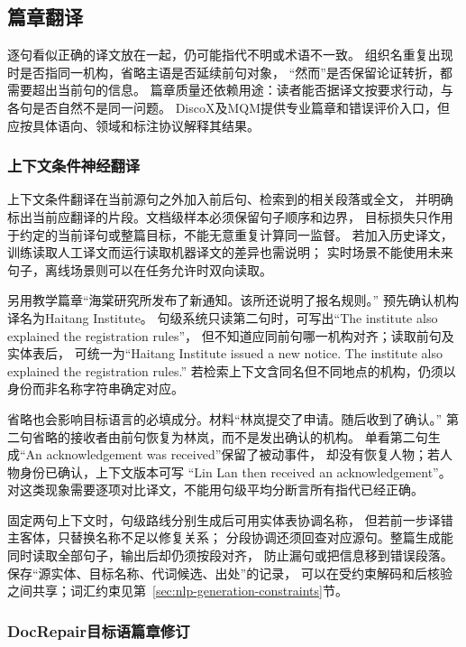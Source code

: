 \subsection{篇章翻译}
\label{sec:nlp-generation-document-translation}

逐句看似正确的译文放在一起，仍可能指代不明或术语不一致。
组织名重复出现时是否指同一机构，省略主语是否延续前句对象，
“然而”是否保留论证转折，都需要超出当前句的信息。
篇章质量还依赖用途：读者能否据译文按要求行动，与各句是否自然不是同一问题。
DiscoX及MQM提供专业篇章和错误评价入口，但应按具体语向、领域和标注协议解释其结果。

\subsubsection{上下文条件神经翻译}
\label{sec:nlp-generation-context-translation}

上下文条件翻译在当前源句之外加入前后句、检索到的相关段落或全文，
并明确标出当前应翻译的片段。文档级样本必须保留句子顺序和边界，
目标损失只作用于约定的当前译句或整篇目标，不能无意重复计算同一监督。
若加入历史译文，训练读取人工译文而运行读取机器译文的差异也需说明；
实时场景不能使用未来句子，离线场景则可以在任务允许时双向读取。

另用教学篇章“海棠研究所发布了新通知。该所还说明了报名规则。”
预先确认机构译名为Haitang Institute。
句级系统只读第二句时，可写出“The institute also explained the registration rules”，
但不知道应同前句哪一机构对齐；读取前句及实体表后，
可统一为“Haitang Institute issued a new notice.
The institute also explained the registration rules.”
若检索上下文含同名但不同地点的机构，仍须以身份而非名称字符串确定对应。

省略也会影响目标语言的必填成分。材料“林岚提交了申请。随后收到了确认。”
第二句省略的接收者由前句恢复为林岚，而不是发出确认的机构。
单看第二句生成“An acknowledgement was received”保留了被动事件，
却没有恢复人物；若人物身份已确认，上下文版本可写
“Lin Lan then received an acknowledgement”。
对这类现象需要逐项对比译文，不能用句级平均分断言所有指代已经正确。

固定两句上下文时，句级路线分别生成后可用实体表协调名称，
但若前一步译错主客体，只替换名称不足以修复关系；
分段协调还须回查对应源句。整篇生成能同时读取全部句子，输出后却仍须按段对齐，
防止漏句或把信息移到错误段落。保存“源实体、目标名称、代词候选、出处”的记录，
可以在受约束解码和后核验之间共享；词汇约束见第~\ref{sec:nlp-generation-constraints}节。

\subsubsection{DocRepair目标语篇章修订}
\label{sec:nlp-generation-docrepair}

